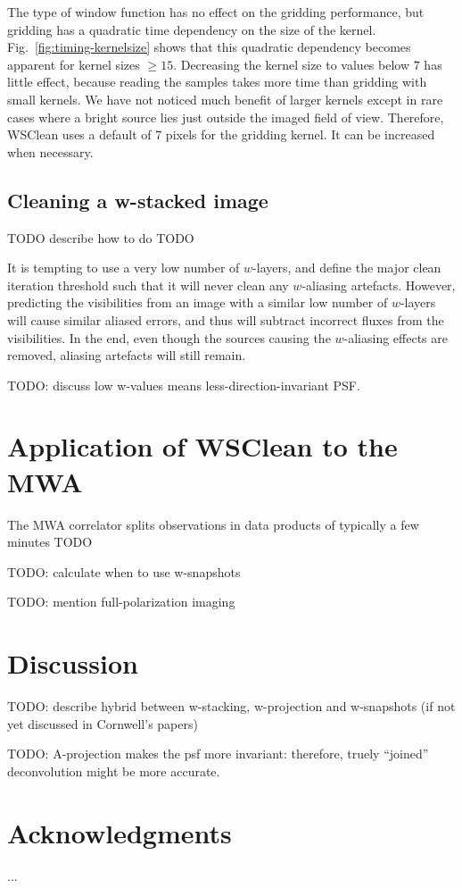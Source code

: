 \documentclass[useAMS,usenatbib]{mn2e}
\DeclareRobustCommand{\TUSSEN}[3]{#2}
\begin{document}
The type of window function has no effect on the gridding performance, but gridding has a quadratic time dependency on the size of the kernel. Fig.~\ref{fig:timing-kernelsize} shows that this quadratic dependency becomes apparent for kernel sizes $\ge 15$. Decreasing the kernel size to values below $7$ has little effect, because reading the samples takes more time than gridding with small kernels. We have not noticed much benefit of larger kernels except in rare cases where a bright source lies just outside the imaged field of view. Therefore, WSClean uses a default of 7 pixels for the gridding kernel. It can be increased when necessary.

\subsection{Cleaning a w-stacked image}
TODO describe how to do
TODO \citet{hogbom-clean}

It is tempting to use a very low number of $w$-layers, and define the major clean iteration threshold such that it will never clean any $w$-aliasing artefacts. However, predicting the visibilities from an image with a similar low number of $w$-layers will cause similar aliased errors, and thus will subtract incorrect fluxes from the visibilities. In the end, even though the sources causing the $w$-aliasing effects are removed, aliasing artefacts will still remain.

TODO: discuss low w-values means less-direction-invariant PSF.


\section{Application of WSClean to the MWA}
The MWA correlator splits observations in data products of typically a few minutes
TODO

TODO: calculate when to use w-snapshots

TODO: mention full-polarization imaging


\section{Discussion} \label{sec:discussion}
TODO: describe hybrid between w-stacking, w-projection and w-snapshots (if not yet discussed in Cornwell's papers)

TODO: A-projection makes the psf more invariant: therefore, truely ``joined'' deconvolution might be more accurate.

\section*{Acknowledgments}
...

\DeclareRobustCommand{\TUSSEN}[3]{#3}




\label{lastpage}
\end{document}

